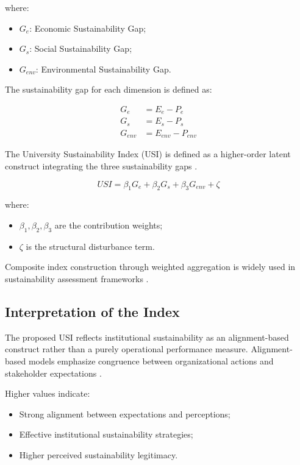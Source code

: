 \documentclass[12pt,a4paper]{article}
\begin{document}
where:

\begin{itemize}
\item $G_e$: Economic Sustainability Gap;
\item $G_s$: Social Sustainability Gap;
\item $G_{env}$: Environmental Sustainability Gap.
\end{itemize}

The sustainability gap for each dimension is defined as:

\begin{align}
G_e &= E_e - P_e \label{eq:ge} \\
G_s &= E_s - P_s \label{eq:gs} \\
G_{env} &= E_{env} - P_{env} \label{eq:genv}
\end{align}

The University Sustainability Index (USI) is defined as a higher-order latent construct integrating the three sustainability gaps \citep{Bollen1989,Ringle2015}.

\begin{equation}
USI = \beta_1 G_e + \beta_2 G_s + \beta_3 G_{env} + \zeta
\label{eq:usi}
\end{equation}

where:

\begin{itemize}
\item $\beta_1, \beta_2, \beta_3$ are the contribution weights;
\item $\zeta$ is the structural disturbance term.
\end{itemize}

Composite index construction through weighted aggregation is widely used in sustainability assessment frameworks \citep{OECD2008,Nardo2005}.

\subsection{Interpretation of the Index}

The proposed USI reflects institutional sustainability as an alignment-based construct rather than a purely operational performance measure. Alignment-based models emphasize congruence between organizational actions and stakeholder expectations \citep{Suchman1995}.

Higher values indicate:

\begin{itemize}
\item Strong alignment between expectations and perceptions;
\item Effective institutional sustainability strategies;
\item Higher perceived sustainability legitimacy.
\end{itemize}
\end{document}
